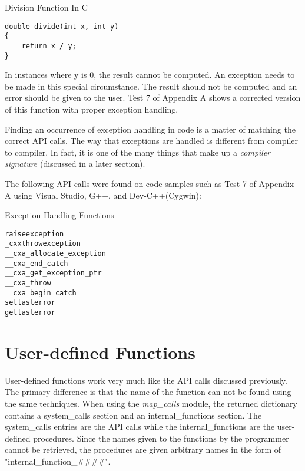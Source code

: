 \documentclass{article}
\begin{document}
\begin{algorithm}
\lstset{language=[mips]Assembler}
\caption{Division Function In C}
\begin{lstlisting}
double divide(int x, int y)
{
    return x / y;
}
\end{lstlisting}
\end{algorithm}

In instances where y is 0, the result cannot be computed.  An exception needs to be made in this special circumstance.  The result should not be
computed and an error should be given to the user.  Test 7 of Appendix A shows a corrected version of this function with proper exception handling.

Finding an occurrence of exception handling in code is a matter of matching the correct API calls.  The way that exceptions are handled is different
from compiler to compiler.  In fact, it is one of the many things that make up a \emph{compiler signature} (discussed in a later section).

The following API calls were found on code samples such as Test 7 of Appendix A using Visual Studio, G++, and Dev-C++(Cygwin):\\

\begin{algorithm}
\lstset{language=[mips]Assembler}
\caption{Exception Handling Functions}
\begin{lstlisting}
raiseexception
_cxxthrowexception
__cxa_allocate_exception
__cxa_end_catch
__cxa_get_exception_ptr
__cxa_throw
__cxa_begin_catch
setlasterror
getlasterror
\end{lstlisting}
\end{algorithm}

\pagebreak

\section*{User-defined Functions}
User-defined functions work very much like the API calls discussed previously.  The primary difference is that the name of the function can 
not be found using the same techniques.  When using the \emph{map\_calls} module, the returned dictionary contains a system\_calls section
and an internal\_functions section.  The system\_calls entries are the API calls while the internal\_functions are the user-defined procedures.
Since the names given to the functions by the programmer cannot be retrieved, the procedures are given arbitrary names in the form of "internal\_function\_\#\#\#\#".
\end{document}
